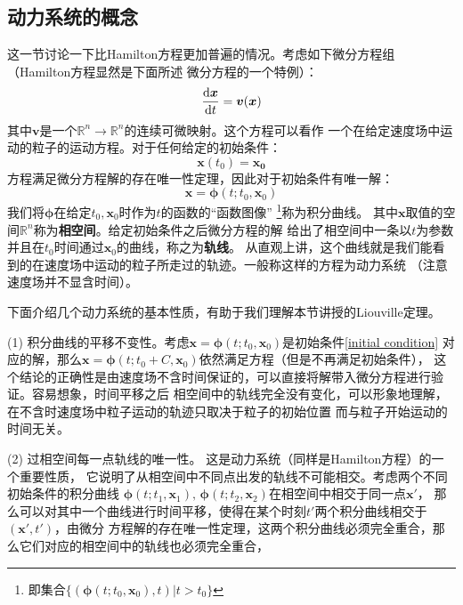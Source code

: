     \subsection{动力系统的概念}
    这一节讨论一下比Hamilton方程更加普遍的情况。考虑如下微分方程组（Hamilton方程显然是下面所述
    微分方程的一个特例）：
    \begin{equation}
        \frac{\mathrm{d}{\bm{x}}}{\mathrm{d}{t}} = \bm{v}(\bm{x})
        \label{dynamical system}
    \end{equation}
    其中$\bm{v}$是一个$\mathbb{R}^{n}\to\mathbb{R}^{n}$的连续可微映射。这个方程可以看作
    一个在给定速度场中运动的粒子的运动方程。对于任何给定的初始条件：
    \begin{equation}
        \bm{x}(t_0) = \bm{x_0}
        \label{initial condition}
    \end{equation}
    方程满足微分方程解的存在唯一性定理\cite{丁同仁2004常微分方程教程}，因此对于初始条件有唯一解：
    \begin{equation}
        \bm{x} = \bm{\phi}(t;t_0, \bm{x}_0)
    \end{equation}
    我们将$\bm{\phi}$在给定$t_0,\bm{x}_0$时作为$t$的函数的“函数图像”
    \footnote{即集合$\{(\bm{\phi}(t;t_0,\bm{x}_0), t)|t>t_0\}$}称为积分曲线。
    其中$\bm{x}$取值的空间$\mathbb{R}^n$称为\textbf{相空间}。给定初始条件之后微分方程的解
    给出了相空间中一条以$t$为参数并且在$t_0$时间通过$\bm{x}_0$的曲线，称之为\textbf{轨线}。
    从直观上讲，这个曲线就是我们能看到的在速度场中运动的粒子所走过的轨迹。一般称这样的方程为动力系统
    （注意速度场并不显含时间）。
    \par 下面介绍几个动力系统的基本性质，有助于我们理解本节讲授的Liouville定理。
    \par (1) 积分曲线的平移不变性。考虑$\bm{x} = \bm{\phi}(t;t_0,\bm{x}_0)$是初始条件\ref{initial condition}
    对应的解，那么$\bm{x} = \bm{\phi}(t;t_0 + C,\bm{x}_0)$依然满足方程（但是不再满足初始条件），
    这个结论的正确性是由速度场不含时间保证的，可以直接将解带入微分方程进行验证。容易想象，时间平移之后
    相空间中的轨线完全没有变化，可以形象地理解，在不含时速度场中粒子运动的轨迹只取决于粒子的初始位置
    而与粒子开始运动的时间无关。
    \par (2) 过相空间每一点轨线的唯一性。 这是动力系统（同样是Hamilton方程）的一个重要性质，
    它说明了从相空间中不同点出发的轨线不可能相交。考虑两个不同初始条件的积分曲线
    $\bm{\phi}(t;t_1,\bm{x}_1),\, \bm{\phi}(t; t_2, \bm{x}_2)$在相空间中相交于同一点$\bm{x}'$，
    那么可以对其中一个曲线进行时间平移，使得在某个时刻$t'$两个积分曲线相交于$(\bm{x}', t')$，由微分
    方程解的存在唯一性定理，这两个积分曲线必须完全重合，那么它们对应的相空间中的轨线也必须完全重合，
